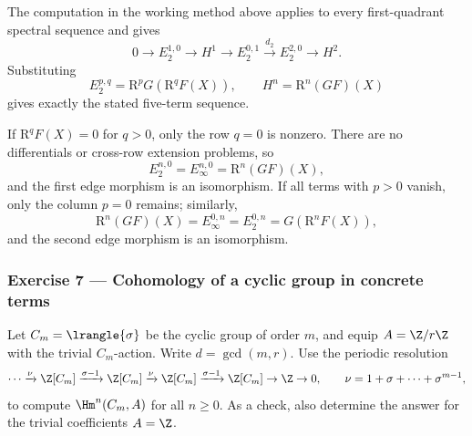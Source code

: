 The computation in the working method above applies to every first-quadrant
spectral sequence and gives
\[
	0\to E_2^{1,0}\to H^1\to E_2^{0,1}
	\xrightarrow{d_2}E_2^{2,0}\to H^2.
\]
Substituting
\[
	E_2^{p,q}=\mathrm{R}^pG(\mathrm{R}^qF(X)),
	\qquad H^n=\mathrm{R}^n(GF)(X)
\]
gives exactly the stated five-term sequence.

If $\mathrm{R}^qF(X)=0$ for $q>0$, only the row $q=0$ is nonzero. There
are no differentials or cross-row extension problems, so
\[
	E_2^{n,0}=E_\infty^{n,0}=\mathrm{R}^n(GF)(X),
\]
and the first edge morphism is an isomorphism. If all terms with $p>0$
vanish, only the column $p=0$ remains; similarly,
\[
	\mathrm{R}^n(GF)(X)=E_\infty^{0,n}=E_2^{0,n}
	=G(\mathrm{R}^nF(X)),
\]
and the second edge morphism is an isomorphism.

\subsubsection*{Exercise 7 --- Cohomology of a cyclic group in concrete terms}
\hypertarget{o014.mastery.derived-spectral.002.ex07}{ }
\label{mastery:derived-spectral-002-ex07}

Let $C_m=\lrangle{\sigma}$ be the cyclic group of order $m$, and equip
$A=\Z/r\Z$ with the trivial $C_m$-action. Write $d=\gcd(m,r)$. Use the
periodic resolution
\[
	\cdots\xrightarrow{\nu}\Z[C_m]
	\xrightarrow{\sigma-1}\Z[C_m]
	\xrightarrow{\nu}\Z[C_m]
	\xrightarrow{\sigma-1}\Z[C_m]\to\Z\to0,
	\qquad \nu=1+\sigma+\cdots+\sigma^{m-1},
\]
to compute $\Hm^n(C_m,A)$ for all $n\geq0$. As a check, also determine the
answer for the trivial coefficients $A=\Z$.

